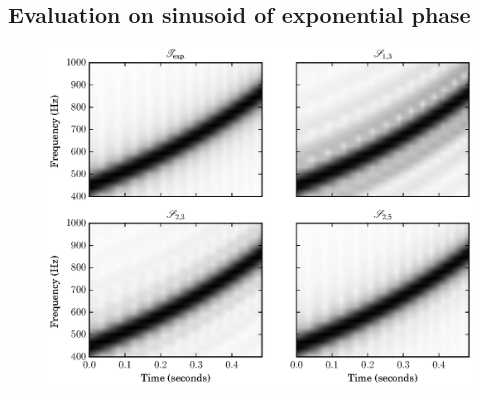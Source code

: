 
\subsection{Evaluation on sinusoid of exponential phase \label{sec:evalexpphase}}
\begin{figure}[!t]
    \centering
    \includegraphics[width=\figwidthscale\textwidth]{plots/mq_exp_err_comp_all_spect.eps}
\end{figure}
